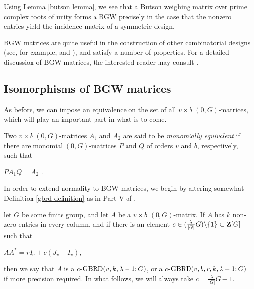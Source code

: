 \documentclass[../../../main]{subfiles}
\begin{document}
Using Lemma \ref{butson lemma}, we see that a Butson weighing matrix over prime
complex roots of unity forms a BGW precisely in the case that the nonzero
entries yield the incidence matrix of a symmetric design.

BGW matrices are quite useful in the construction of other combinatorial designs
(see, for example, \citeauthor{ionin-kharaghani-drad}
\citeyear{ionin-kharaghani-drad} and \citeyear{ionin-kharaghani-srg}), and
satisfy a number of properties. For a detailed discussion of BGW matrices, the
interested reader may consult \cite{combinatorics-of-symmetric-designs}.

\dinkus


\subsection{Isomorphisms of BGW matrices}

As before, we can impose an equivalence on the set of all $v \times b$ $(0,G)$-matrices, which will play an important part in what is to come. 

\begin{defin}\label{monomial-equiv}
  Two $v \times b$ $(0,G)$-matrices $A_1$ and $A_2$ are said to be {\it monomially equivalent} if there are monomial $(0,G)$-matrices $P$ and $Q$ of orders $v$ and $b$, respectively, such that 
  \begin{defenum}
  \item $PA_1Q=A_2$ .
  \end{defenum}
\end{defin}

 In order to extend normality to BGW matrices, we begin by altering somewhat Definition \ref{gbrd definition} as in Part V of \cite{handbook}.
 
 \begin{defin}\label{c-gbrd defintion}
   let $G$ be some finite group, and let $A$ be a $v \times b$ $(0,G)$-matrix. If $A$ has $k$ non-zero entries in every column, and if there is an element $c \in (\frac{\lambda}{|G|}G)\backslash\{1\} \subset \mathbf{Z}[G]$ such that
  \begin{defenum}
   \item\label{c-gbrd-eq} $AA^* = rI_v + c(J_v - I_v)$,
  \end{defenum}
  then we say that $A$ is a $c$-$\text{GBRD}(v,k,\lambda-1;G)$, or a
  $c$-$\text{GBRD}(v,b,r,k,\lambda-1;G)$ if more precision required. In what follows,
  we will always take $c = \frac{\lambda}{|G|}G - 1$.
 \end{defin}
 
\end{document}
